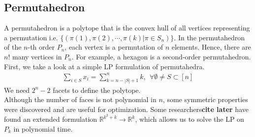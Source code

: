 \documentclass[12pt,letterpaper]{article}
\newcommand*{\R}{\mathbb{R}}
\begin{document}
\subsection{Permutahedron}
A permutahedron is a polytope that is the convex hull of all vertices representing a permutation i.e. $\{(\pi(1), \pi(2), \cdots, \pi(k) | \pi \in S_n) \}$. \cite{doi:10.1137/0122054}
In the permutahedron of the $n$-th order $P_n$, each vertex is a permutation of $n$ elements.
Hence, there are $n!$ many vertices in $P_n$. For example, a hexagon is a second-order permutahedron. 
First, we take a look at a simple LP formulation of permutahedra. 
\begin{align*}
    \sum_{i \in S} x_i = \sum_{k = n - |S| + 1}^n k, \ \ \forall \emptyset \neq S \subset [n]
\end{align*}
We need $2^n - 2$ facets to define the polytope.
\\
Although the number of faces is not polynomial in $n$,
some symmetric properties were discovered and are useful for optimization. Some researchers\textbf{cite later}
have found an extended formulation $\R^{k^2+k} \rightarrow \R^{k}$, which allows us 
to solve the LP on $P_k$ in polynomial time. 
\end{document}
